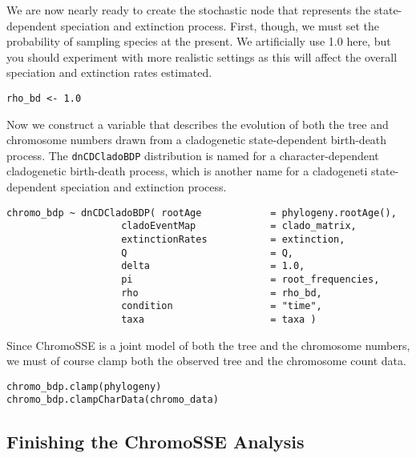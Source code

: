 We are now nearly ready to create the stochastic node that represents
the state-dependent speciation and extinction process.
First, though, we must set the probability of sampling species at the present.
We artificially use 1.0 here, but you should experiment with more realistic settings
as this will affect the overall speciation and extinction rates estimated.
{\tt \begin{snugshade*}
\begin{lstlisting}
rho_bd <- 1.0
\end{lstlisting}
\end{snugshade*}
}
Now we construct a variable that describes the evolution of both the tree and chromosome
numbers drawn from a cladogenetic state-dependent birth-death process.
The \texttt{dnCDCladoBDP} distribution is named for a
character-dependent cladogenetic birth-death process, which is
another name for a cladogeneti state-dependent speciation and extinction process.
{\tt \begin{snugshade*}
\begin{lstlisting}
chromo_bdp ~ dnCDCladoBDP( rootAge            = phylogeny.rootAge(),
                    cladoEventMap             = clado_matrix,
                    extinctionRates           = extinction,
                    Q                         = Q,
                    delta                     = 1.0,
                    pi                        = root_frequencies,
                    rho                       = rho_bd,
                    condition                 = "time",
                    taxa                      = taxa )
\end{lstlisting}
\end{snugshade*}
}
Since ChromoSSE is a joint model of both the tree and the chromosome numbers,
we must of course clamp both the observed tree and the chromosome count data.
{\tt \begin{snugshade*}
\begin{lstlisting}
chromo_bdp.clamp(phylogeny)
chromo_bdp.clampCharData(chromo_data)
\end{lstlisting}
\end{snugshade*}
}

\medskip 
\subsection{Finishing the ChromoSSE Analysis}

